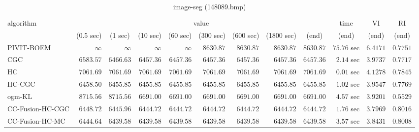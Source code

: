 \begin{table}[H]
\scriptsize
\centering
\caption{image-seg (148089.bmp)}
\label{tab:anytimetable-image-seg-148089.bmp}
\begin{tabular}{lrrrrrrrrrrr}
\toprule
           algorithm &                                   \multicolumn{8}{c}{value} & \multicolumn{1}{c}{time}    & \multicolumn{1}{c}{VI}  & \multicolumn{1}{c}{RI} \\  
\cmidrule(lr){2-9}\cmidrule(lr){10-10} \cmidrule(lr){11-11} \cmidrule(lr){12-12}   
                     & \multicolumn{1}{c}{(0.5 sec)} & \multicolumn{1}{c}{(1 sec)} & \multicolumn{1}{c}{(10 sec)} & \multicolumn{1}{c}{(60 sec)} & \multicolumn{1}{c}{(300 sec)} & \multicolumn{1}{c}{(600 sec)} & \multicolumn{1}{c}{(1800 sec)} & \multicolumn{1}{c}{(end)} & \multicolumn{1}{c}{(end)}    & \multicolumn{1}{c}{(end)}   & \multicolumn{1}{c}{(end)}  \\ \midrule 
          PIVIT-BOEM & $\infty$ & $\infty$ & $\infty$ & $\infty$ & $      8630.87$ & $      8630.87$ & $      8630.87$ & $      8630.87$ & $        75.76$ sec    & $       6.4171$  & $       0.7751$ \\ 
                 CGC & $      6583.57$ & $      6466.63$ & $      6457.36$ & $      6457.36$ & $      6457.36$ & $      6457.36$ & $      6457.36$ & $      6457.36$ & $         2.14$ sec    & $       3.9737$  & $       0.7717$ \\ 
                  HC & $      7061.69$ & $      7061.69$ & $      7061.69$ & $      7061.69$ & $      7061.69$ & $      7061.69$ & $      7061.69$ & $      7061.69$ & $         0.01$ sec    & $       4.1278$  & $       0.7845$ \\ 
              HC-CGC & $      6458.50$ & $      6455.85$ & $      6455.85$ & $      6455.85$ & $      6455.85$ & $      6455.85$ & $      6455.85$ & $      6455.85$ & $         1.02$ sec    & $       3.9547$  & $       0.7769$ \\ 
              ogm-KL & $      8715.56$ & $      8715.56$ & $      6691.00$ & $      6691.00$ & $      6691.00$ & $      6691.00$ & $      6691.00$ & $      6691.00$ & $         4.57$ sec    & $       3.9201$  & $       0.5529$ \\ 
    CC-Fusion-HC-CGC & $      6448.72$ & $      6445.96$ & $      6444.72$ & $      6444.72$ & $      6444.72$ & $      6444.72$ & $      6444.72$ & $      6444.72$ & $         1.76$ sec    & $       3.7969$  & $       0.8016$ \\ 
     CC-Fusion-HC-MC & $      6444.64$ & $      6439.58$ & $      6439.58$ & $      6439.58$ & $      6439.58$ & $      6439.58$ & $      6439.58$ & $      6439.58$ & $         3.57$ sec    & $       3.8431$  & $       0.8008$ \\ 

\end{tabular}
\end{table}

